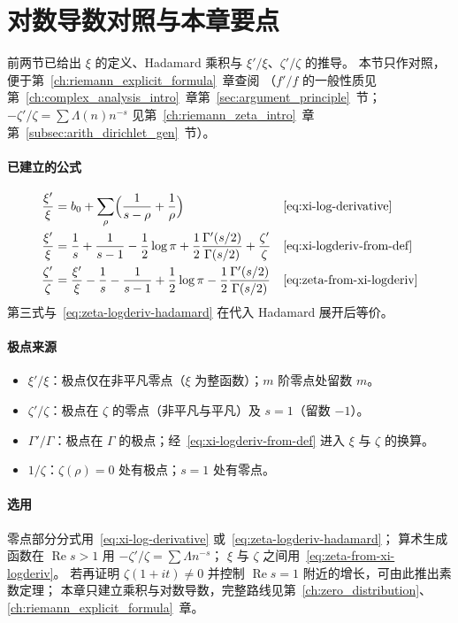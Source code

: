 \section*{对数导数对照与本章要点}
\label{sec:log-derivative-summary}

前两节已给出 $\xi$ 的定义、Hadamard 乘积与 $\xi'/\xi$、$\zeta'/\zeta$ 的推导。
本节只作对照，便于第~\ref{ch:riemann_explicit_formula}~章查阅
（$f'/f$ 的一般性质见第~\ref{ch:complex_analysis_intro}~章第~\ref{sec:argument_principle}~节；
$-\zeta'/\zeta=\sum\Lambda(n)n^{-s}$ 见第~\ref{ch:riemann_zeta_intro}~章第~\ref{subsec:arith_dirichlet_gen}~节）。

\paragraph{已建立的公式}
\begin{align}
  \frac{\xi'}{\xi}
  &= b_0+\sum_{\rho}\Bigl(\frac{1}{s-\rho}+\frac{1}{\rho}\Bigr)
  &&\text{\eqref{eq:xi-log-derivative}}
  \\
  \frac{\xi'}{\xi}
  &= \frac{1}{s}+\frac{1}{s-1}-\frac12\log\pi
    +\frac12\frac{\Gamma'(s/2)}{\Gamma(s/2)}+\frac{\zeta'}{\zeta}
  &&\text{\eqref{eq:xi-logderiv-from-def}}
  \\
  \frac{\zeta'}{\zeta}
  &= \frac{\xi'}{\xi}-\frac{1}{s}-\frac{1}{s-1}
    +\frac12\log\pi-\frac12\frac{\Gamma'(s/2)}{\Gamma(s/2)}
  &&\text{\eqref{eq:zeta-from-xi-logderiv}}
\end{align}
第三式与~\eqref{eq:zeta-logderiv-hadamard} 在代入 Hadamard 展开后等价。

\paragraph{极点来源}
\begin{itemize}
  \item $\xi'/\xi$：极点仅在非平凡零点（$\xi$ 为整函数）；$m$ 阶零点处留数 $m$。
  \item $\zeta'/\zeta$：极点在 $\zeta$ 的零点（非平凡与平凡）及 $s=1$（留数 $-1$）。
  \item $\Gamma'/\Gamma$：极点在 $\Gamma$ 的极点；经~\eqref{eq:xi-logderiv-from-def} 进入 $\xi$ 与 $\zeta$ 的换算。
  \item $1/\zeta$：$\zeta(\rho)=0$ 处有极点；$s=1$ 处有零点。
\end{itemize}

\paragraph{选用}
零点部分分式用~\eqref{eq:xi-log-derivative} 或~\eqref{eq:zeta-logderiv-hadamard}；
算术生成函数在 $\operatorname{Re}s>1$ 用 $-\zeta'/\zeta=\sum\Lambda n^{-s}$；
$\xi$ 与 $\zeta$ 之间用~\eqref{eq:zeta-from-xi-logderiv}。
若再证明 $\zeta(1+it)\neq 0$ 并控制 $\operatorname{Re}s=1$ 附近的增长，可由此推出素数定理；
本章只建立乘积与对数导数，完整路线见第~\ref{ch:zero_distribution}、\ref{ch:riemann_explicit_formula}~章。

